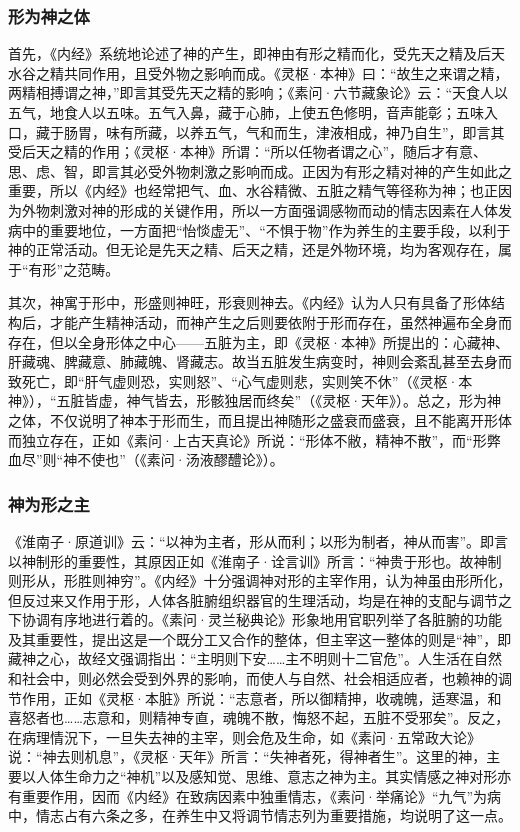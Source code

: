 \documentclass[12pt]{ctexbook}
\begin{document}
\subsubsection{形为神之体}%

首先，《内经》系统地论述了神的产生，即神由有形之精而化，受先天之精及后天水谷之精共同作用，且受外物之影响而成。《灵枢·本神》曰：“故生之来谓之精，两精相搏谓之神，”即言其受先天之精的影响；《素问·六节藏象论》云：“天食人以五气，地食人以五味。五气入鼻，藏于心肺，上使五色修明，音声能彰；五味入口，藏于肠胃，味有所藏，以养五气，气和而生，津液相成，神乃自生”，即言其受后天之精的作用；《灵枢·本神》所谓：“所以任物者谓之心”，随后才有意、思、虑、智，即言其必受外物刺激之影响而成。正因为有形之精对神的产生如此之重要，所以《内经》也经常把气、血、水谷精微、五脏之精气等径称为神；也正因为外物刺激对神的形成的关键作用，所以一方面强调感物而动的情志因素在人体发病中的重要地位，一方面把“怡惔虚无”、“不惧于物”作为养生的主要手段，以利于神的正常活动。但无论是先天之精、后天之精，还是外物环境，均为客观存在，属于“有形”之范畴。

其次，神寓于形中，形盛则神旺，形衰则神去。《内经》认为人只有具备了形体结构后，才能产生精神活动，而神产生之后则要依附于形而存在，虽然神遍布全身而存在，但以全身形体之中心——五脏为主，即《灵枢·本神》所提出的：心藏神、肝藏魂、脾藏意、肺藏魄、肾藏志。故当五脏发生病变时，神则会紊乱甚至去身而致死亡，即“肝气虚则恐，实则怒”、“心气虚则悲，实则笑不休”（《灵枢·本神》），“五脏皆虚，神气皆去，形骸独居而终矣”（《灵枢·天年》）。总之，形为神之体，不仅说明了神本于形而生，而且提出神随形之盛衰而盛衰，且不能离开形体而独立存在，正如《素问·上古天真论》所说：“形体不敝，精神不散”，而“形弊血尽”则“神不使也”（《素问·汤液醪醴论》）。

\subsubsection{神为形之主}%

《淮南子·原道训》云：“以神为主者，形从而利；以形为制者，神从而害”。即言以神制形的重要性，其原因正如《淮南子·诠言训》所言：“神贵于形也。故神制则形从，形胜则神穷”。《内经》十分强调神对形的主宰作用，认为神虽由形所化，但反过来又作用于形，人体各脏腑组织器官的生理活动，均是在神的支配与调节之下协调有序地进行着的。《素问·灵兰秘典论》形象地用官职列举了各脏腑的功能及其重要性，提出这是一个既分工又合作的整体，但主宰这一整体的则是“神”，即藏神之心，故经文强调指出：“主明则下安……主不明则十二官危”。人生活在自然和社会中，则必然会受到外界的影响，而使人与自然、社会相适应者，也赖神的调节作用，正如《灵枢·本脏》所说：“志意者，所以御精抻，收魂魄，适寒温，和喜怒者也……志意和，则精神专直，魂魄不散，悔怒不起，五脏不受邪矣”。反之，在病理情況下，一旦失去神的主宰，则会危及生命，如《素问·五常政大论》说：“神去则机息”，《灵枢·天年》所言：“失神者死，得神者生”。这里的神，主要以人体生命力之“神机”以及感知觉、思维、意志之神为主。其实情感之神对形亦有重要作用，因而《内经》在致病因素中独重情志，《素问·举痛论》“九气”为病中，情志占有六条之多，在养生中又将调节情志列为重要措施，均说明了这一点。
\end{document}
